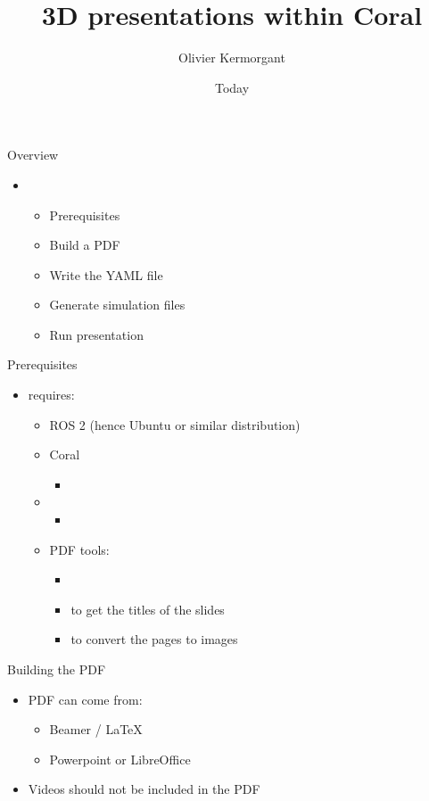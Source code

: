 \documentclass{ecnbeamer}
\title{3D presentations within Coral}
\author{Olivier Kermorgant}
\date{Today}
\begin{document}
\MakeTitleNoFoot
\FootPage

\begin{frame}{Overview}
 
\begin{itemize}
\item ~ \vfill
\begin{itemize}
 \item Prerequisites\vfill
 \item Build a PDF\vfill
 \item Write the YAML file\vfill
 \item Generate simulation files \vfill
 \item Run presentation
\end{itemize}
\end{itemize}
\end{frame}

\begin{frame}{Prerequisites}
\begin{itemize}[<+->]
 \item {} requires:\vfill
 \begin{itemize}
  \item ROS 2 (hence Ubuntu or similar distribution)\vfill
  \item Coral
  \begin{itemize}
   \item {}
  \end{itemize}\vfill
    \item {}
  \begin{itemize}
   \item {}
  \end{itemize}\vfill
  \item PDF tools:
  \begin{itemize}
   \item {}
   \item {} to get the titles of the slides
   \item {} to convert the pages to images
  \end{itemize}
 \end{itemize}
\end{itemize} 
\end{frame}


\begin{frame}{Building the PDF}
\begin{itemize}
 \item PDF can come from:
 \begin{itemize}
  \item Beamer / LaTeX\vfill
  \item Powerpoint or LibreOffice
 \end{itemize}\vfill
 \item Videos should not be included in the PDF\vfill
\end{itemize} 
\end{frame}
\end{document}
